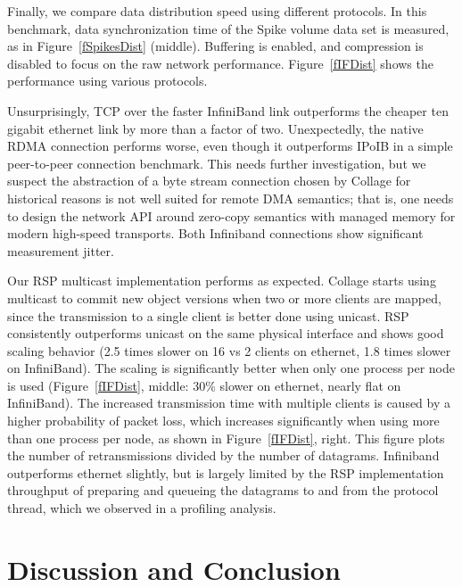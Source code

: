 \documentclass[10pt,journal,compsoc]{IEEEtran}
\newcommand{\fig}[1]{Figure~\ref{#1}}
\begin{document}
Finally, we compare data distribution speed using different protocols. In this
benchmark, data synchronization time of the Spike volume data set is measured,
as in \fig{fSpikesDist} (middle). Buffering is enabled, and compression is
disabled to focus on the raw network performance. \fig{fIFDist} shows the
performance using various protocols.

Unsurprisingly, TCP over the faster InfiniBand link outperforms the cheaper ten
gigabit ethernet link by more than a factor of two. Unexpectedly, the native
RDMA connection performs worse, even though it outperforms IPoIB in a simple
peer-to-peer connection benchmark. This needs further investigation, but we
suspect the abstraction of a byte stream connection chosen by \textsf{Collage}
for historical reasons is not well suited for remote DMA semantics; that is,
one needs to design the network API around zero-copy semantics with managed
memory for modern high-speed transports. Both Infiniband connections show
significant measurement jitter.

Our RSP multicast implementation performs as expected. \textsf{Collage} starts
using multicast to commit new object versions when two or more clients are
mapped, since the transmission to a single client is better done using unicast.
RSP consistently outperforms unicast on the same physical interface and shows
good scaling behavior (2.5 times slower on 16 vs 2 clients on ethernet, 1.8
times slower on InfiniBand). The scaling is significantly better when only one
process per node is used (\fig{fIFDist}, middle: 30\% slower on ethernet,
nearly flat on InfiniBand). The increased transmission time with multiple
clients is caused by a higher probability of packet loss, which increases
significantly when using more than one process per node, as shown in
\fig{fIFDist}, right. This figure plots the number of retransmissions
divided by the number of datagrams. Infiniband outperforms ethernet slightly,
but is largely limited by the RSP implementation throughput of preparing and
queueing the datagrams to and from the protocol thread, which we observed in a
profiling analysis.

\section{Discussion and Conclusion}
\label{sec:conclusions}
\end{document}
